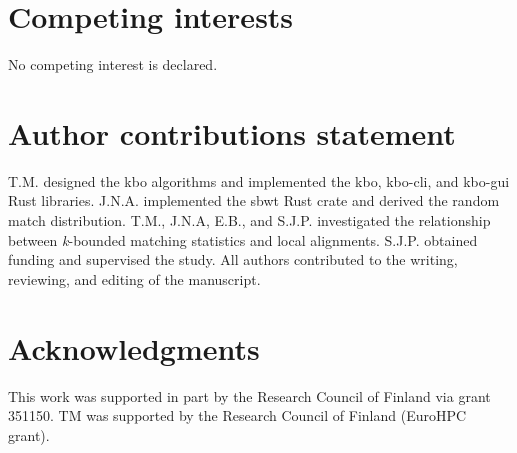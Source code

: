 \documentclass[unnumsec,webpdf,contemporary,large]{oup-authoring-template}%
\theoremstyle{thmstyleone}%
\theoremstyle{thmstyletwo}%
\theoremstyle{thmstylethree}%
\begin{document}
\section{Competing interests}
No competing interest is declared.

\section{Author contributions statement}
T.M. designed the kbo algorithms and implemented the kbo, kbo-cli, and kbo-gui Rust libraries. J.N.A. implemented the sbwt Rust crate and derived the random match distribution. T.M., J.N.A, E.B., and S.J.P. investigated the relationship between \emph{k}-bounded matching statistics and local alignments. S.J.P. obtained funding and supervised the study. All authors contributed to the writing, reviewing, and editing of the manuscript.

\section{Acknowledgments}
This work was supported in part by the Research Council of Finland via grant 351150. TM was supported by the Research Council of Finland (EuroHPC grant).

%
%






%
%
\end{document}

